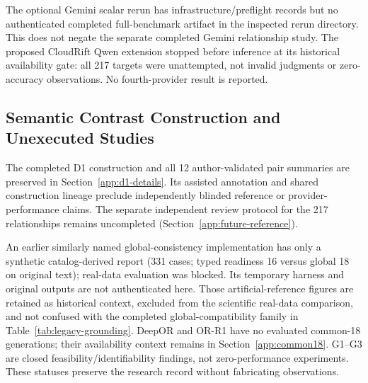 The optional Gemini scalar rerun has infrastructure/preflight records but no authenticated completed full-benchmark artifact in the inspected rerun directory. This does not negate the separate completed Gemini relationship study. The proposed CloudRift Qwen extension stopped before inference at its historical availability gate: all 217 targets were unattempted, not invalid judgments or zero-accuracy observations. No fourth-provider result is reported.

\subsection{Semantic Contrast Construction and Unexecuted Studies}
The completed D1 construction and all 12 author-validated pair summaries are preserved in Section~\ref{app:d1-details}. Its assisted annotation and shared construction lineage preclude independently blinded reference or provider-performance claims. The separate independent review protocol for the 217 relationships remains uncompleted (Section~\ref{app:future-reference}).

An earlier similarly named global-consistency implementation has only a synthetic catalog-derived report (331 cases; typed readiness 16 versus global 18 on original text); real-data evaluation was blocked. Its temporary harness and original outputs are not authenticated here. Those artificial-reference figures are retained as historical context, excluded from the scientific real-data comparison, and not confused with the completed global-compatibility family in Table~\ref{tab:legacy-grounding}. DeepOR and OR-R1 have no evaluated common-18 generations; their availability context remains in Section~\ref{app:common18}. G1--G3 are closed feasibility/identifiability findings, not zero-performance experiments. These statuses preserve the research record without fabricating observations.
